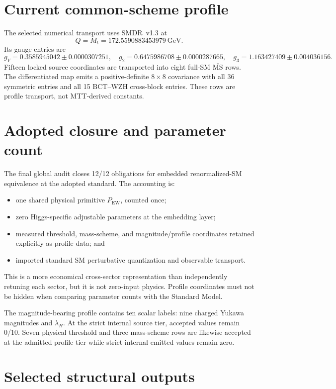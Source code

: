 \documentclass[11pt]{article}
\begin{document}
\section{Current common-scheme profile}

The selected numerical transport uses SMDR~v1.3 at
\[
Q=M_t=172.5590883453979~\mathrm{GeV}.
\]
Its gauge entries are
\[
g_Y=0.3585945042\pm0.0000307251,
\quad g_2=0.6475986708\pm0.0000287665,
\quad g_3=1.163427409\pm0.004036156.
\]
Fifteen locked source coordinates are transported into eight full-SM
$\overline{\mathrm{MS}}$ rows. The differentiated map emits a positive-definite
$8\times8$ covariance with all 36 symmetric entries and all 15 BCT--WZH
cross-block entries. These rows are profile transport, not MTT-derived
constants.

\section{Adopted closure and parameter count}

The final global audit closes 12/12 obligations for embedded renormalized-SM
equivalence at the adopted standard. The accounting is:
\begin{itemize}
\item one shared physical primitive $P_{\mathrm{EW}}$, counted once;
\item zero Higgs-specific adjustable parameters at the embedding layer;
\item measured threshold, mass-scheme, and magnitude/profile coordinates
retained explicitly as profile data; and
\item imported standard SM perturbative quantization and observable transport.
\end{itemize}
This is a more economical cross-sector representation than independently
retuning each sector, but it is not zero-input physics. Profile coordinates
must not be hidden when comparing parameter counts with the Standard Model.

The magnitude-bearing profile contains ten scalar labels: nine charged Yukawa
magnitudes and $\lambda_H$. At the strict internal source tier, accepted values
remain 0/10. Seven physical threshold and three mass-scheme rows are likewise
accepted at the admitted profile tier while strict internal emitted values
remain zero.

\section{Selected structural outputs}
\end{document}
